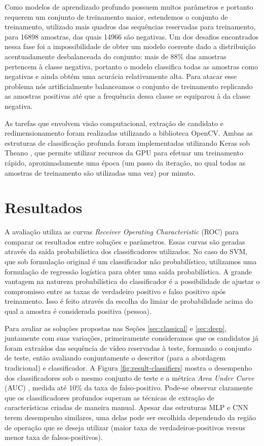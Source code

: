         Como modelos de aprendizado profundo possuem muitos parâmetros e portanto requerem um conjunto de treinamento maior, estendemos o conjunto de treinamento, utilizado mais quadros das sequências reservadas para treinamento, para 16898 amostras, das quais 14966 são negativas. Um dos desafios encontrados nessa fase foi a impossibilidade de obter um modelo coerente dado a distribuição acentuadamente desbalanceada do conjunto: mais de 88\% das amostras pertencem à classe negativa, portanto o modelo classifica todas as amostras como negativas e ainda obtém uma acurácia relativamente alta. Para atacar esse problema nós artificialmente balanceamos o conjunto de treinamento replicando as amostras positivas até que a frequência dessa classe se equiparou à da classe negativa.

        As tarefas que envolvem visão computacional, extração de candidato e redimensionamento foram realizadas utilizando a biblioteca OpenCV. Ambas as estruturas de classificação profunda foram implementadas utilizando Keras \cite{keras} sob Theano \cite{theano}, que permite utilizar recursos da GPU para efetuar um treinamento rápido, aproximadamente uma época (um passo da iteração, no qual todas as amostras de treinamento são utilizadas uma vez) por minuto.

\section{Resultados}
\label{sec:results}

    A avaliação utiliza as curvas \textit{Receiver Operating Characteristic} (ROC) \cite{evaluationMetrics} para comparar os resultados entre soluções e parâmetros. Essas curvas são geradas através da saída probabilística dos classificadores utilizados. No caso do SVM, que sob formulação original é um classificador não probabilístico, utilizamos uma formulação de regressão logística \cite{svmProbabilisticOutput} para obter uma saída probabilística. A grande vantagem na natureza probabilística do classificador é a possibilidade de ajustar o compromisso entre as taxas de verdadeiro positivo e falso positivo após treinamento. Isso é feito através da escolha do limiar de probabilidade acima do qual a amostra é considerada positiva (pessoa).

    Para avaliar as soluções propostas nas Seções \ref{sec:classical} e \ref{sec:deep}, juntamente com suas variações, primeiramente consideramos que os candidatos já foram extraídos das sequência de vídeo reservadas à teste, formando o conjunto de teste, então avaliando conjuntamente o descritor (para a abordagem tradicional) e classificador. A Figura \ref{fig:result-classifiers} mostra o desempenho dos classificadores sob o mesmo conjunto de teste e a métrica \textit{Area Under Curve} (AUC) \cite{evaluationMetrics}, medida até 10\% da taxa de falso-positivo. Pode-se observar claramente que os classificadores profundos superam as técnicas de extração de características criadas de maneira manual. Apesar das estruturas MLP e CNN terem desempenho similares, uma delas pode ser escolhida dependendo da região de operação que se deseja utilizar (maior taxa de verdadeiros-positivos versus menor taxa de falsos-positivos).

